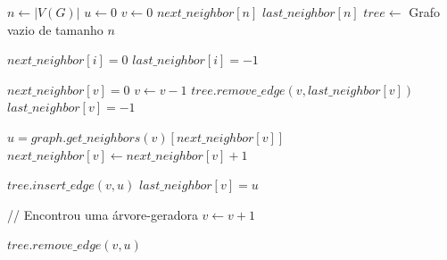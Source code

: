 \begin{algorithm}[!ht]
\begin{footnotesize}
\SetAlgoLined
{}
\Begin
{
    $n \gets |V(G)|$\;
    $u \gets 0$\;
    $v \gets 0$\;
    $next\_neighbor[n]$\;
    $last\_neighbor[n]$\;
    $tree \gets$ Grafo vazio de tamanho $n$\;

    {
        $next\_neighbor[i] = 0$\;
        $last\_neighbor[i] = -1$\;
    }

    {
        {
            $next\_neighbor[v] = 0$\;
            $v \gets v - 1$\;
            {
                \Break
            }
            $tree.remove\_edge(v, last\_neighbor[v])$\;
            $last\_neighbor[v] = -1$\;
        }
        \Else
        {
            $u = graph.get\_neighbors(v)[next\_neighbor[v]]$\;
            $next\_neighbor[v] \gets next\_neighbor[v] + 1$\;

            {
                $tree.insert\_edge(v, u)$\;
                $last\_neighbor[v] = u$

                {
                    {
                        // Encontrou uma árvore-geradora
                    }
                    \Else
                    {
                        $v \gets v + 1$\;
                    }
                }

                $tree.remove\_edge(v, u)$\;
            }
        }
    }
}
\caption{\textsc{$generate\_sequential$}\label{alg:generate_sequential}}
\end{footnotesize}
\end{algorithm}